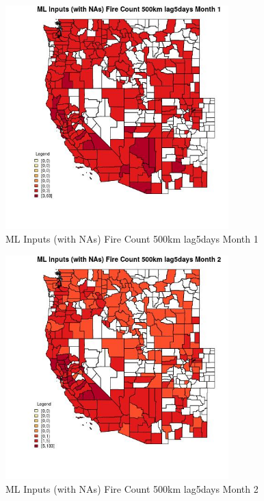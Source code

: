 \begin{figure} 
\centering  
\includegraphics[width=0.77\textwidth]{Code_Outputs/Report_ML_input_PM25_Step4_part_e_de_duplicated_aves_compiled_2019-05-21wNAs_CountyFire_Count_500km_lag5daysmedianMonth1.jpg} 
\caption{\label{fig:Report_ML_input_PM25_Step4_part_e_de_duplicated_aves_compiled_2019-05-21wNAsCountyFire_Count_500km_lag5daysmedianMonth1}ML Inputs (with NAs) Fire Count 500km lag5days Month 1} 
\end{figure} 
 

\begin{figure} 
\centering  
\includegraphics[width=0.77\textwidth]{Code_Outputs/Report_ML_input_PM25_Step4_part_e_de_duplicated_aves_compiled_2019-05-21wNAs_CountyFire_Count_500km_lag5daysmedianMonth2.jpg} 
\caption{\label{fig:Report_ML_input_PM25_Step4_part_e_de_duplicated_aves_compiled_2019-05-21wNAsCountyFire_Count_500km_lag5daysmedianMonth2}ML Inputs (with NAs) Fire Count 500km lag5days Month 2} 
\end{figure} 
 

